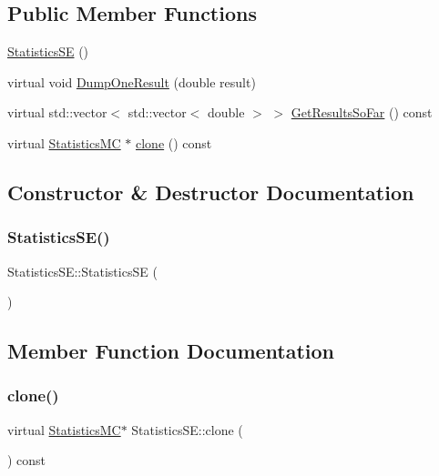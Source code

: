 \subsection*{Public Member Functions}
\begin{DoxyCompactItemize}
\item 
\hyperlink{classStatisticsSE_a99d2eaf451e72a7411eda5c18ed4c3af}{Statistics\+SE} ()
\item 
virtual void \hyperlink{classStatisticsSE_a3628cdafd9ed239168b4fc50db7f1e1e}{Dump\+One\+Result} (double result)
\item 
virtual std\+::vector$<$ std\+::vector$<$ double $>$ $>$ \hyperlink{classStatisticsSE_a4ae9b974c43eccf3e60b307eb26689a4}{Get\+Results\+So\+Far} () const
\item 
virtual \hyperlink{classStatisticsMC}{Statistics\+MC} $\ast$ \hyperlink{classStatisticsSE_a935f22f6610e3a9ad584a8805293d740}{clone} () const
\end{DoxyCompactItemize}


\subsection{Constructor \& Destructor Documentation}
\hypertarget{classStatisticsSE_a99d2eaf451e72a7411eda5c18ed4c3af}{}\label{classStatisticsSE_a99d2eaf451e72a7411eda5c18ed4c3af} 
\subsubsection{\texorpdfstring{Statistics\+S\+E()}{StatisticsSE()}}
{\footnotesize\ttfamily Statistics\+S\+E\+::\+Statistics\+SE (\begin{DoxyParamCaption}{ }\end{DoxyParamCaption})}



\subsection{Member Function Documentation}
\hypertarget{classStatisticsSE_a935f22f6610e3a9ad584a8805293d740}{}\label{classStatisticsSE_a935f22f6610e3a9ad584a8805293d740} 
\subsubsection{\texorpdfstring{clone()}{clone()}}
{\footnotesize\ttfamily virtual \hyperlink{classStatisticsMC}{Statistics\+MC}$\ast$ Statistics\+S\+E\+::clone (\begin{DoxyParamCaption}{ }\end{DoxyParamCaption}) const\hspace{0.3cm}{\ttfamily [virtual]}}



